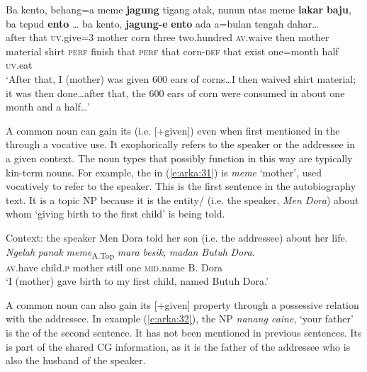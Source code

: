 \documentclass[output=paper
,modfonts
,nonflat]{langsci/langscibook}
\begin{document}
\begin{exe}
	\ex\label{e:arka:30}
	\gll Ba kento,   behang=a   meme   \textbf{jagung}   tigang   atak, nunun   ntas   meme   \textbf{lakar} \textbf{baju},    ba   tepud   \textbf{ento} … ba   kento,  \textbf{jagung-e}   \textbf{ento}   ada   a=bulan   tengah   dahar…\\
	after that  \textsc{uv}.give=3  mother  corn  three  two.hundred \textsc{av}.waive  then  mother  material shirt  \textsc{perf}  finish  that {} \textsc{perf}  that  corn-\textsc{def}  that  exist  one=month  half  \textsc{uv}.eat\\
	\glt ‘After that, I (mother) was given 600 ears of corns…I then waived shirt material; it was then done…after that, the 600 ears of corn were consumed in about one month and a half…’
\end{exe}

\noindent
A common noun can gain its  (i.e. [+given]) even when first mentioned in the  through a vocative use. It exophorically refers to the speaker or the addressee in a given context. The noun types that possibly function in this way are typically kin-term nouns. For example, the  in (\ref{e:arka:31}) is \textit{meme} ‘mother’, used vocatively to refer to the speaker. This is the first sentence in the autobiography text. It is a topic NP because it is the entity/ (i.e. the speaker, \textit{Men Dora}) about whom ‘giving birth to the first child’ is being told. 

\begin{exe}
	\ex\label{e:arka:31}{Context: the speaker Men Dora told her son (i.e. the addressee) about her life.}\\
	\gll \textit{Ngelah}   \textit{panak}    {\ob}\textit{meme}{\cb}\textsubscript{A.Top}    \textit{mara}   \textit{besik}, \textit{madan} \textit{Butuh} \textit{Dora}.\\
	\textsc{av}.have  child.\textsc{p}  \phantom{[}mother  still   one   \textsc{mid}.name  B. Dora\\
	\glt ‘I (mother) gave birth to my first child, named Butuh Dora.’
\end{exe}

\noindent
A common noun can also gain its [+given] property through a possessive relation with the addressee. In example (\ref{e:arka:32}), the NP \textit{nanang caine}, ‘your father’ is the  of the second sentence. It has not been mentioned in previous sentences. Its  is part of the shared CG information, as it is the father of the addressee who is also the husband of the speaker. 
\end{document}
